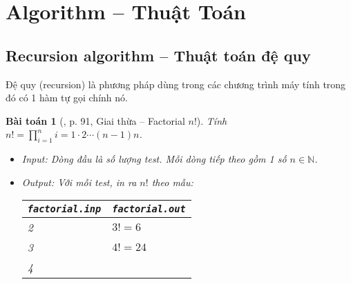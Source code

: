 \documentclass{article}
\newtheorem{baitoan}{Bài toán}
\begin{document}

\section{Algorithm -- Thuật Toán}

\subsection{Recursion algorithm -- Thuật toán đệ quy}
Đệ quy (recursion) là phương pháp dùng trong các chương trình máy tính trong đó có 1 hàm tự gọi chính nó.

\begin{baitoan}[\cite{VietSTEM2021}, p. 91, Giai thừa -- Factorial $n!$]
	Tính $n! = \prod_{i=1}^n i = 1\cdot2\cdots(n - 1)n$.
	\begin{itemize}
		\item {\sf Input:} Dòng đầu là số lượng test. Mỗi dòng tiếp theo gồm 1 số $n\in\mathbb{N}$.
		\item {\sf Output:} Với mỗi test, in ra $n!$ theo mẫu:
		\begin{table}[H]
			\centering
			\begin{tabular}{|l|l|}
				\hline
				\texttt{factorial.inp} & \texttt{factorial.out} \\
				\hline
				2 & $3! = 6$ \\
				3 & $4! = 24$ \\
				4 &  \\
				\hline
			\end{tabular}
		\end{table}
	\end{itemize}
\end{baitoan}
\end{document}
